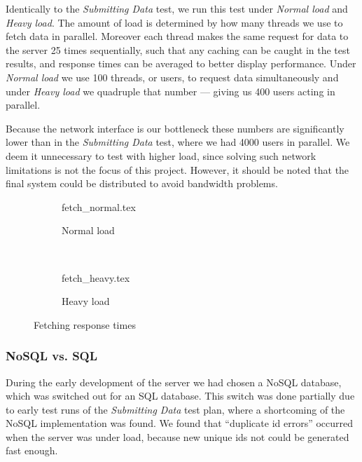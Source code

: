 Identically to the \textit{Submitting Data} test, we run this test under \textit{Normal load} and \textit{Heavy load}.
The amount of load is determined by how many threads we use to fetch data in parallel.
Moreover each thread makes the same request for data to the server 25 times sequentially, such that any caching can be caught in the test results, and response times can be averaged to better display performance.
Under \textit{Normal load} we use 100 threads, or users, to request data simultaneously and under \textit{Heavy load} we quadruple that number --- giving us 400 users acting in parallel.

Because the network interface is our bottleneck these numbers are significantly lower than in the \textit{Submitting Data} test, where we had 4000 users in parallel.
We deem it unnecessary to test with higher load, since solving such network limitations is not the focus of this project.
However, it should be noted that the final system could be distributed to avoid bandwidth problems.

\begin{figure}[!htb]
    \begin{subfigure}[b]{\textwidth}
        \footnotesize
        \centering
        {fetch_normal.tex}
        \caption{Normal load}\label{fig:fetch_test_results_normal}
    \end{subfigure}\\
    \begin{subfigure}[b]{\textwidth}
        \footnotesize
        \centering
        {fetch_heavy.tex}
        \caption{Heavy load}\label{fig:fetch_test_results_heavy}
    \end{subfigure}
    \caption{Fetching response times}\label{fig:fetch_test_results}
\end{figure}

\subsubsection*{NoSQL vs. SQL}\label{subsec:nosql_vs._sql}
During the early development of the server we had chosen a NoSQL database, which was switched out for an SQL database.
This switch was done partially due to early test runs of the \textit{Submitting Data} test plan, where a shortcoming of the NoSQL implementation was found.
We found that \enquote{duplicate id errors} occurred when the server was under load, because new unique ids not could be generated fast enough.

